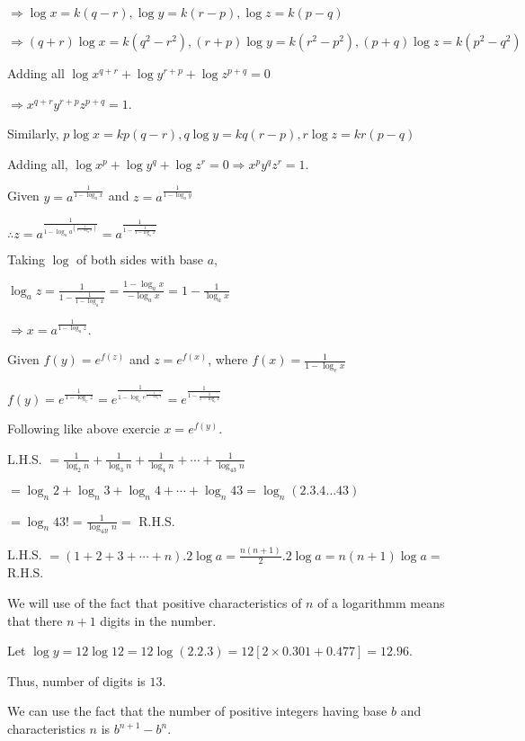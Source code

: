   $\Rightarrow \log x = k(q - r), \log y = k(r - p), \log z = k(p - q)$

  $\Rightarrow (q + r)\log x = k(q^2 - r^2), (r + p)\log y = k(r^2 - p^2), (p + q)\log z = k(p^2 - q^2)$

  Adding all $\log x^{q + r} + \log y^{r + p} + \log z^{p + q} = 0$

  $\Rightarrow x^{q + r}y^{r + p}z^{p + q} = 1$.

  Similarly, $p\log x = kp(q - r), q\log y = kq(r - p), r\log z = kr(p - q)$

  Adding all, $\log x^p + \log y^q + \log z^r = 0 \Rightarrow x^py^qz^r = 1$.
\item Given $y = a^{\tfrac{1}{1 - \log_ax}}$ and $z = a^{\tfrac{1}{1 - \log_ay}}$

  $\therefore z = a^{\tfrac{1}{1 - \log_aa^{\left(\tfrac{1}{1 - \log_ax}\right)}}} = a^{\tfrac{1}{1 - \tfrac{1}{1 - \log_ax}}}$

  Taking $\log$ of both sides with base $a$,

  $\log_az = \frac{1}{1 - \tfrac{1}{1 - \log_ax}} = \frac{1 - \log_ax}{-\log_ax} = 1 - \frac{1}{\log_ax}$

  $\Rightarrow x = a^{\tfrac{1}{1 - \log_az}}$.
\item Given $f(y) = e^{f(z)}$ and $z = e^{f(x)}$, where $f(x) = \frac{1}{1 - \log_ex}$

  $f(y) = e^{\tfrac{1}{1 - \log_ez}} = e^{\tfrac{1}{1 - \log_ee^{\tfrac{1}{1 - \log_ex}}}} = e^{\tfrac{1}{1 - \tfrac{1}{1 -
      \log_ex}}}$

  Following like above exercie $x = e^{f(y)}$.
\item L.H.S. $= \frac{1}{\log_2n} + \frac{1}{\log_3n} + \frac{1}{\log_4n} + \cdots + \frac{1}{\log_{43}n}$

  $= \log_n2 + \log_n3 + \log_n4 + \cdots + \log_n43 = \log_n(2.3.4\ldots 43)$

  $= \log_n43! = \frac{1}{\log_{43!}n} =$ R.H.S.
\item L.H.S. $= (1 + 2 + 3 + \cdots + n).2\log a = \frac{n(n + 1)}{2}.2\log a = n(n + 1)\log a =$ R.H.S.
\item We will use of the fact that positive characteristics of $n$ of a logarithmm means that there $n + 1$ digits in the number.

  Let $\log y = 12\log 12 = 12\log(2.2.3) = 12[2\times0.301 + 0.477] = 12.96$.

  Thus, number of digits is $13$.
\item We can use the fact that the number of positive integers having base $b$ and characteristics $n$ is $b^{n + 1} - b^n$.

